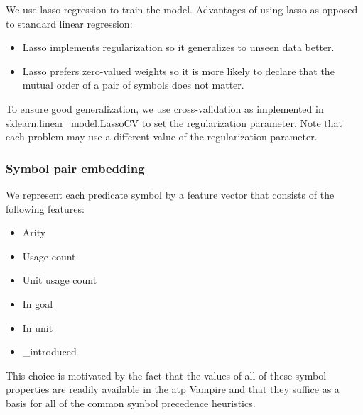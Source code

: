 We use lasso regression \cite{?} to train the model.
Advantages of using lasso as opposed to standard linear regression\cite{?}:

\begin{itemize}
	\item Lasso implements regularization so it generalizes to unseen data better.
	\item Lasso prefers zero-valued weights so it is more likely to declare that the mutual order of a pair of symbols does not matter.
\end{itemize}

To ensure good generalization,
we use cross-validation as implemented in sklearn.linear\_model.LassoCV \cite{?}
to set the regularization parameter.
Note that each problem may use a different value of the regularization parameter.

\subsubsection{Symbol pair embedding}

We represent each predicate symbol by a feature vector that consists of the following features:

\begin{itemize}
	\item Arity
	\item Usage count
	\item Unit usage count
	\item In goal
	\item In unit
	
	\item {} \_introduced
	
	
\end{itemize}

This choice is motivated by the fact that the values of all of these symbol properties
are readily available in the \gls{atp} Vampire
and that they suffice as a basis for all of the common symbol precedence heuristics.

